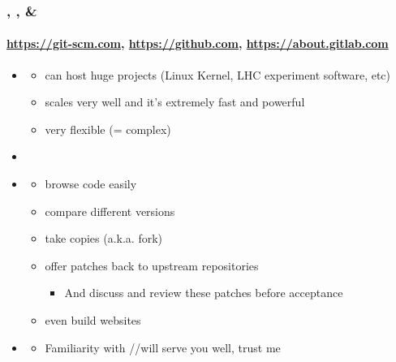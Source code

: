 \documentclass[hyperref={colorlinks=true}]{beamer}
\begin{document}
\begin{frame}%
  \frametitle{\git, \github, \& \gitlab }
  \framesubtitle{\url{https://git-scm.com}, \url{https://github.com}, \url{https://about.gitlab.com}}
  
  \begin{itemize}
    \item {}
    \begin{itemize}
      \item can host huge projects (Linux Kernel, LHC experiment software, etc)
      \item scales very well and it's extremely fast and powerful
      \item very flexible (= complex)
    \end{itemize}
    \item {}
    \item {}
    \begin{itemize}
      \item browse code easily
      \item compare different versions
      \item take copies (a.k.a. fork)
      \item offer patches back to upstream repositories
      \begin{itemize}
        \item And discuss and review these patches before acceptance
      \end{itemize}
      \item even build websites
    \end{itemize}
    \item {}
    \begin{itemize}
      \item Familiarity with \git/\github/\gitlab will serve you well, trust me
    \end{itemize}
  \end{itemize}
  
\end{frame}

\end{document}
